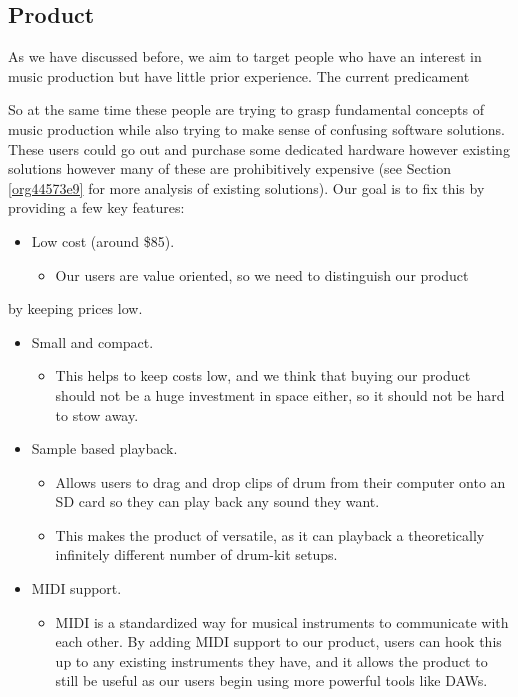 \documentclass[11pt]{article}
\begin{document}
\subsection{Product}
\label{sec:org1f0f98b}

   As we have discussed before, we aim to target people who have an
interest in music production but have little prior experience. The 
current predicament 

So at the same time these people are trying to grasp fundamental
concepts of music production while also trying to make sense of
confusing software solutions. These users could go out and purchase
some dedicated hardware however existing solutions however many of
these are prohibitively expensive (see Section \ref{org44573e9} for more
analysis of existing solutions). Our goal is to fix this by providing
a few key features:

\begin{itemize}
\item Low cost (around \$85).
\begin{itemize}
\item Our users are value oriented, so we need to distinguish our product
\end{itemize}
\end{itemize}
by keeping prices low.
\begin{itemize}
\item Small and compact.
\begin{itemize}
\item This helps to keep costs low, and we think that buying our product
should not be a huge investment in space either, so it should not
be hard to stow away.
\end{itemize}
\item Sample based playback.
\begin{itemize}
\item Allows users to drag and drop clips of drum from their computer
onto an SD card so they can play back any sound they want.
\item This makes the product of versatile, as it can playback a theoretically
infinitely different number of drum-kit setups.
\end{itemize}
\item MIDI support.
\begin{itemize}
\item MIDI is a standardized way for musical instruments to communicate with each other. By
adding MIDI support to our product, users can hook this up to
any existing instruments they have, and it allows the product to
still be useful as our users begin using more powerful tools
like DAWs.
\end{itemize}
\end{itemize}
\end{document}
